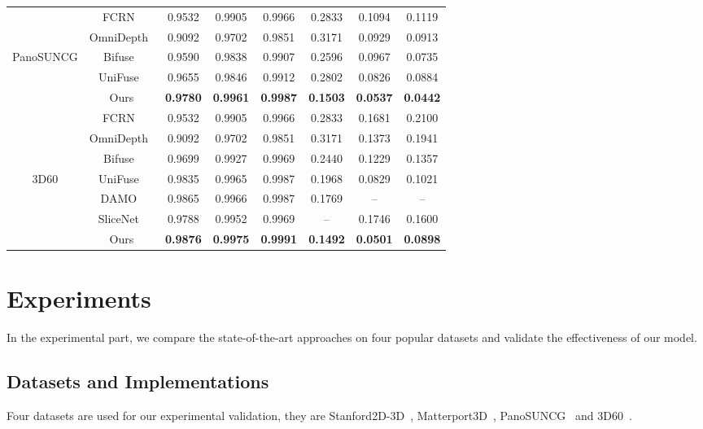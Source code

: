\documentclass[runningheads]{llncs}
\begin{document}
\begin{table*}[t]
\begin{center}
{\begin{tabular}{c|c|c|c|c|c|c|c}
  \hline
    & FCRN~\cite{laina2016deeper}&0.9532&0.9905&0.9966&0.2833&0.1094&0.1119\\
    \cline{2-8}
 & OmniDepth~\cite{zioulis2018omnidepth} &0.9092&0.9702&0.9851&0.3171&0.0929&0.0913 \\
  \cline{2-8}
   PanoSUNCG&Bifuse~\cite{wang2020bifuse}&0.9590&0.9838&0.9907&0.2596&0.0967&0.0735\\
  \cline{2-8}
  & UniFuse~\cite{jiang2021unifuse}&0.9655&0.9846&0.9912&0.2802&0.0826&0.0884 \\
   \cline{2-8}
    &Ours &\textbf{0.9780}&\textbf{0.9961}&\textbf{0.9987}&\textbf{0.1503}&\textbf{0.0537}&\textbf{0.0442}\\
  \hline & FCRN~\cite{laina2016deeper}&0.9532&0.9905&0.9966&0.2833&0.1681&0.2100\\
    \cline{2-8}
 & OmniDepth~\cite{zioulis2018omnidepth} &0.9092&0.9702&0.9851&0.3171&0.1373&0.1941 \\
  \cline{2-8}
   &Bifuse~\cite{wang2020bifuse}&0.9699&0.9927&0.9969&0.2440&0.1229&0.1357\\
  \cline{2-8}
  3D60& UniFuse~\cite{jiang2021unifuse}&0.9835&0.9965&0.9987&0.1968&0.0829&0.1021 \\
  \cline{2-8}
   & DAMO~\cite{chen2021distortion}&0.9865&0.9966&0.9987&0.1769&--&-- \\
   \cline{2-8}
   & SliceNet~\cite{pintore2021slicenet}&0.9788&0.9952&0.9969&--&0.1746&0.1600 \\
   \cline{2-8}
    & Ours &\textbf{0.9876}&\textbf{0.9975}&\textbf{0.9991}&\textbf{0.1492}&\textbf{0.0501}&\textbf{0.0898}\\
\hline
\end{tabular}}
\end{center}
\end{table*}

\section{Experiments}
\label{section5}
In the experimental part, we compare the state-of-the-art approaches on four popular datasets and validate the effectiveness of our model.
\subsection{Datasets and Implementations}
Four datasets are used for our experimental validation, they are Stanford2D-3D~\cite{armeni2017joint}, Matterport3D~\cite{chang2017matterport3d}, PanoSUNCG~\cite{song2017semantic} and 3D60~\cite{zioulis2018omnidepth}. 
\end{document}
